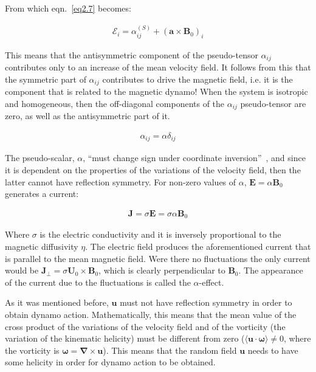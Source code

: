 \documentclass[a4paper,12pt]{article}
\begin{document}
From which eqn.~\ref{eq2.7} becomes:

\begin{align}
 \mathcal{E}_i = \alpha_{ij}^{(S)} + (\bm a \times \bm B_0)_i \nonumber
\end{align}

This means that the antisymmetric component of the pseudo-tensor $\alpha_{ij}$ contributes only to an increase of the mean velocity field. It follows from this that the symmetric part of $\alpha_{ij}$ contributes to drive the magnetic field, i.e. it is the component that is related to the magnetic dynamo! When the system is isotropic and homogeneous, then the off-diagonal components of the $\alpha_{ij}$ pseudo-tensor are zero, as well as the antisymmetric part of it.

\begin{align}
 \alpha_{ij} = \alpha \delta_{ij} \nonumber
\end{align}

The pseudo-scalar, $\alpha$, ``must change sign under coordinate inversion''~\cite{schnack2009lectures}, and since it is dependent on the properties of the variations of the velocity field, then the latter cannot have reflection symmetry. For non-zero values of $\alpha$, $\mathcal{\bm E} = \alpha \bm B_0$ generates a current:

\begin{align}
 \bm J = \sigma \mathcal{\bm E} = \sigma \alpha \bm B_0 \nonumber
\end{align}

Where $\sigma$ is the electric conductivity and it is inversely proportional to the magnetic diffusivity $\eta$. The electric field produces the aforementioned current that is parallel to the mean magnetic field. Were there no fluctuations the only current would be $\bm J_{\bot} = \sigma \bm U_0 \times \bm B_0$, which is clearly perpendicular to $\bm B_0$. The appearance of the current due to the fluctuations is called the $\alpha$-effect.

As it was mentioned before, $\bm u$ must not have reflection symmetry in order to obtain dynamo action. Mathematically, this means that the mean value of the cross product of the variations of the velocity field and of the vorticity (the variation of the kinematic helicity) must be different from zero ($\langle \bm u \cdot \bm \omega \rangle \neq 0$, where the vorticity is $\bm \omega = \bm \nabla \times \bm u$). This means that the random field $\bm u$ needs to have some helicity in order for dynamo action to be obtained.
\end{document}
